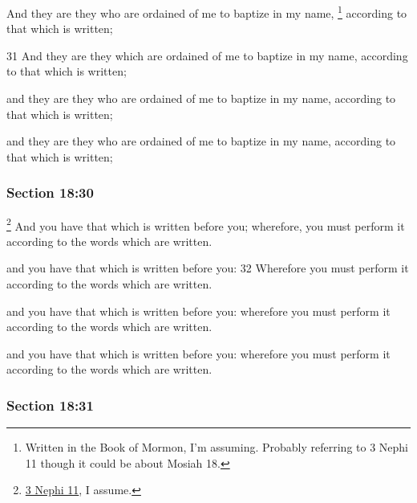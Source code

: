 		And they are they who are ordained of me to baptize in my name,
			\footnote{%
				Written in the Book of Mormon, I'm assuming. Probably referring to 3 Nephi 11 though it could be about Mosiah 18.
				}%
		according to that which is written;

		\begin{framed}
		\scriptsize
			\begin{compactdesc}
				\item[JSP] 31 And they are they which are ordained of me to baptize in my name, according to that which is written; 
				\item[DC 1835] and they are they who are ordained of me to baptize in my name, according to that which is written; 
				\item[DC 1844] and they are they who are ordained of me to baptize in my name, according to that which is written; 
			\end{compactdesc}
		\end{framed}

	\subsubsection{Section 18:30} %
		\label{DC18-30}

			\footnote{%
				\hyperref[3NEPHI-11]{3 Nephi 11}, I assume.
				}%
		And you have that which is written before you; wherefore, you must perform it according to the words which are written.

		\begin{framed}
		\scriptsize
			\begin{compactdesc}
				\item[JSP] and you have that which is written before you: 32 Wherefore you must perform it according to the words which are written.
				\item[DC 1835] and you have that which is written before you: wherefore you must perform it according to the words which are written.
				\item[DC 1844] and you have that which is written before you: wherefore you must perform it according to the words which are written. 
			\end{compactdesc}
		\end{framed}

	\subsubsection{Section 18:31} %
		\label{DC18-31}

